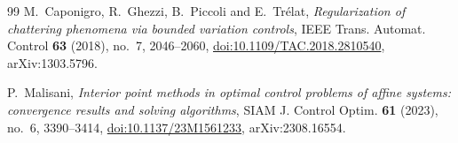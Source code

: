 \documentclass[11pt,reqno]{amsart}
\theoremstyle{definition}
\numberwithin{equation}{section}
\begin{document}
\begin{thebibliography}{99}
M.~Caponigro, R.~Ghezzi, B.~Piccoli and E.~Tr\'elat,
\emph{Regularization of chattering phenomena via bounded variation controls},
IEEE Trans. Automat. Control \textbf{63} (2018), no.~7, 2046--2060, \href{https://doi.org/10.1109/TAC.2018.2810540}{doi:10.1109/TAC.2018.2810540}, arXiv:1303.5796.

P.~Malisani,
\emph{Interior point methods in optimal control problems of affine systems: convergence results and solving algorithms},
SIAM J. Control Optim. \textbf{61} (2023), no.~6, 3390--3414, \href{https://doi.org/10.1137/23M1561233}{doi:10.1137/23M1561233}, arXiv:2308.16554.

\end{thebibliography}
\end{document}
